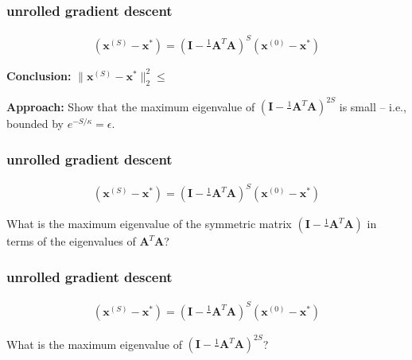 \documentclass[compress]{beamer}
\newcommand{\bv}[1]{\mathbf{#1}}
\DeclareMathOperator*{\lmax}{\lambda_{max}}
\begin{document}
\begin{frame}[t]
	\frametitle{unrolled gradient descent}
	\begin{align*}
		(\bv{x}^{(S)} - \bv{x}^*) =  \left(\bv{I} - \frac{1}{\lmax}\bv{A}^T\bv{A}\right)^S(\bv{x}^{(0)} - \bv{x}^*) 
	\end{align*}
	
	\textbf{Conclusion:}
	 $\|\bv{x}^{(S)} - \bv{x}^*\|_2^2 \leq $
	

	 \vspace{7em}
	 \textbf{Approach:} Show that the maximum eigenvalue of $\left(\bv{I} - \frac{1}{\lmax}\bv{A}^{T}\bv{A}\right)^{2S}$ is small -- i.e., bounded by $e^{-S/\kappa} = \epsilon$. 
\end{frame}

\begin{frame}[t]
	\frametitle{unrolled gradient descent}
	\begin{align*}
		(\bv{x}^{(S)} - \bv{x}^*) =  \left(\bv{I} - \frac{1}{\lmax}\bv{A}^T\bv{A}\right)^S(\bv{x}^{(0)} - \bv{x}^*) 
	\end{align*}

	What is the maximum eigenvalue of the symmetric matrix $\left(\bv{I} - \frac{1}{\lmax}\bv{A}^T\bv{A}\right)$ in terms of the eigenvalues of $\bv{A}^T\bv{A}$?
	
\end{frame}

\begin{frame}[t]
	\frametitle{unrolled gradient descent}
	\begin{align*}
		(\bv{x}^{(S)} - \bv{x}^*) =  \left(\bv{I} - \frac{1}{\lmax}\bv{A}^T\bv{A}\right)^S(\bv{x}^{(0)} - \bv{x}^*) 
	\end{align*}
	
	What is the maximum eigenvalue of $\left(\bv{I} - \frac{1}{\lmax}\bv{A}^T\bv{A}\right)^{2S}$?
	
	
\end{frame}



%	
%	
\end{document}
